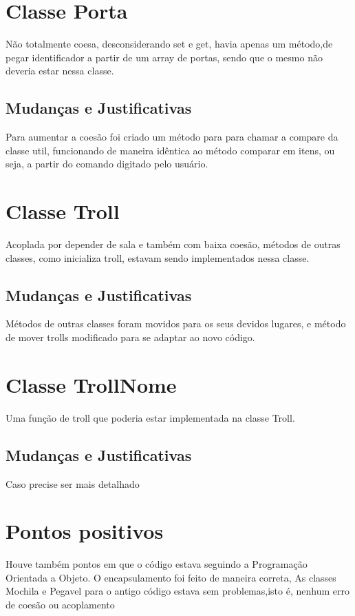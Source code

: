 \documentclass[runningheads,a4paper]{llncs}
\begin{document}
\section{Classe Porta}
    Não totalmente coesa, desconsiderando set e get, havia apenas um método,de pegar identificador a partir de um array de portas, sendo que o mesmo não deveria estar nessa classe.

    \subsection{Mudanças e Justificativas}
        Para aumentar a coesão foi criado um método para para chamar a compare da classe util, funcionando de maneira idêntica ao método comparar em itens, ou seja, a partir do comando digitado pelo usuário. 

\section{Classe Troll}
    Acoplada por depender de sala e também com baixa coesão, métodos de outras classes, como inicializa troll, estavam sendo implementados nessa classe.

    \subsection{Mudanças e Justificativas}
        Métodos de outras classes foram movidos para os seus devidos lugares, e método de mover trolls modificado para se adaptar ao novo código.

\section{Classe TrollNome}
    Uma função de troll que poderia estar implementada na classe Troll. 

    \subsection{Mudanças e Justificativas}
        Caso precise ser mais detalhado

\section{Pontos positivos}

Houve também pontos em que o código estava seguindo a Programação Orientada a Objeto. O encapsulamento foi feito de maneira correta, As classes Mochila e Pegavel para o antigo código estava sem problemas,isto é, nenhum erro de coesão ou acoplamento 
\end{document}
